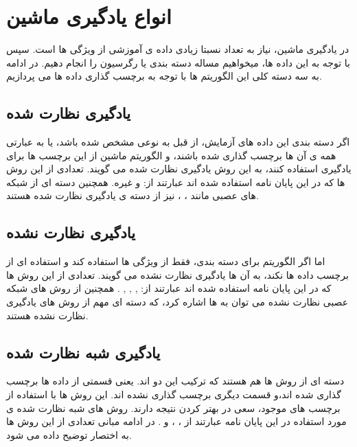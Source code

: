 \section{انواع یادگیری ماشین}

در یادگیری ماشین، نیاز به تعداد نسبتا زیادی داده ی آموزشی از ویژگی ها است. سپس با توجه به این داده ها، میخواهیم مساله دسته بندی یا رگرسیون را انجام دهیم. در ادامه به سه دسته کلی این الگوریتم ها با توجه به برچسب گذاری داده ها می پردازیم.

\subsection{یادگیری نظارت شده}
اگر دسته بندی این داده های آزمایش، از قبل به نوعی مشخص شده باشد، یا به عبارتی همه ی آن ها برچسب گذاری شده باشند، و الگوریتم ماشین از این برچسب ها برای یادگیری استفاده کنند، به این روش یادگیری نظارت شده می گویند. تعدادی از این روش ها که در این پایان نامه استفاده شده اند عبارتند از:
و غیره. همچنین دسته ای از شبکه های عصبی مانند
،
،
نیز از دسته ی یادگیری نظارت شده هستند.

\subsection{یادگیری نظارت نشده}
اما اگر الگوریتم برای دسته بندی، فقط از ویژگی ها استفاده کند و استفاده ای از برچسب داده ها نکند، به آن ها یادگیری نظارت نشده می گویند. تعدادی از این روش ها که در این پایان نامه استفاده شده اند عبارتند از:
,
,
,
.
همچنین از روش های شبکه عصبی نظارت نشده می توان به
ها اشاره کرد، که دسته ای مهم از روش های یادگیری نظارت نشده هستند.

\subsection{یادگیری شبه نظارت شده}
دسته ای از روش ها هم هستند که ترکیب این دو اند. یعنی قسمتی از داده ها برچسب گذاری شده اند،‌و قسمت دیگری برچسب گذاری نشده اند.
این روش ها با استفاده از برچسب های موجود، سعی در بهتر کردن نتیجه دارند. روش های شبه نظارت شده ی مورد استفاده در این پایان نامه عبارتند از
،
،
و
.
در ادامه مبانی تعدادی از این روش ها به اختصار توضیح داده می شود.
